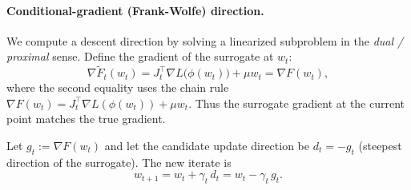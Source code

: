 \documentclass[11pt]{article}
\begin{document}
\paragraph{Conditional-gradient (Frank-Wolfe) direction.}
We compute a descent direction by solving a linearized subproblem in the
\emph{dual / proximal} sense. Define the gradient of the surrogate at $w_t$:
\begin{equation}
\nabla \tilde{F}_t(w_t)
= J_t^\top \nabla L\big(\phi(w_t)\big) + \mu w_t
= \nabla F(w_t),
\label{eq:gradmatch}
\end{equation}
where the second equality uses the chain rule
$\nabla F(w_t) = J_t^\top \nabla L(\phi(w_t)) + \mu w_t$. Thus the surrogate
gradient at the current point matches the true gradient.

Let $g_t := \nabla F(w_t)$ and let the candidate update direction be
$d_t = -g_t$ (steepest direction of the surrogate). The new iterate is
\begin{equation}
w_{t+1} = w_t + \gamma_t \, d_t = w_t - \gamma_t \, g_t .
\label{eq:update}
\end{equation}
\end{document}
